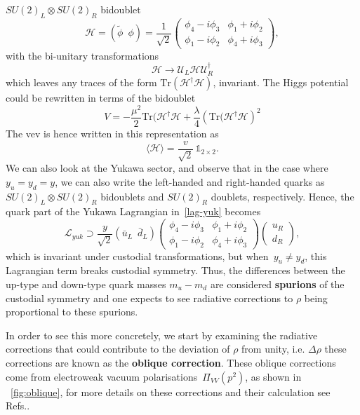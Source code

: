 $SU(2)_L \otimes SU(2)_R$ bidoublet 
\begin{equation}
	\mathcal{H} =(\tilde{\phi} \,\,\, \phi) = \frac{1}{\sqrt{2}}\begin{pmatrix}
		\phi_4-i\phi_3 & \phi_1+i\phi_2 \\
		 \phi_1-i\phi_2 & \phi_4+i\phi_3
	\end{pmatrix},
\end{equation}
with the bi-unitary transformations
\begin{equation}
	\mathcal{H} \longrightarrow \mathcal{U}_L \mathcal{H} \mathcal{U}^\dagger_R
\end{equation}
which leaves any traces of the form $\mathrm{Tr}(\mathcal{H}^\dagger\mathcal{H})$, invariant. The Higgs potential could be rewritten in terms of the bidoublet 
\begin{equation}
	V = -\frac{\mu^2}{2} \mathrm{Tr}(\mathcal{H}^\dagger\mathcal{H} + \frac{\lambda}{4}\left(  \mathrm{Tr}(\mathcal{H}^\dagger\mathcal{H} \right) ^2
\end{equation}
The vev is hence written in this representation as 
\begin{equation}
\langle \mathcal{H} \rangle  = \frac{v}{\sqrt{2}}\, \mathbb{1}_{2\times 2}.
\end{equation}
We can also look at the Yukawa sector, and observe that in the case where $ y_u =y_d =y $, we can also write the left-handed and right-handed quarks  as $SU(2)_L \otimes SU(2)_R$  bidoublets and $SU(2)_R$ doublets, respectively. Hence, the quark part of the Yukawa Lagrangian in~\eqref{lag-yuk} becomes
\begin{equation}
	\mathcal{L}_{yuk} \supset \frac{y}{\sqrt{2}}  (\bar u_L\,\,\, \bar d_L)  \begin{pmatrix}
		\phi_4-i\phi_3 & \phi_1+i\phi_2 \\
		\phi_1-i\phi_2 & \phi_4+i\phi_3  
	\end{pmatrix}  \begin{pmatrix}  u_R \\ d_R	\end{pmatrix} ,
\end{equation}
which is invariant under custodial transformations, but when~$ y_u \neq y_d$, this Lagrangian term breaks custodial symmetry. Thus, the differences between the up-type and down-type quark masses $m_u-m_d$ are considered \textbf{spurions} of the  custodial symmetry and one expects to see radiative corrections to $\rho$ being proportional to these spurions.
\par In order to see this more concretely, we start by examining the radiative corrections that could contribute to the deviation of $\rho$ from unity, i.e. $\Delta \rho$ these corrections are known as the \textbf{oblique correction}. These oblique corrections come from electroweak vacuum polarisations~$\Pi_{VV}(p^2)$, as shown in ~\autoref{fig:oblique}, for more details on these corrections and their calculation see Refs..~\cite{schwartz2014quantum,peskin1995introduction} \\
